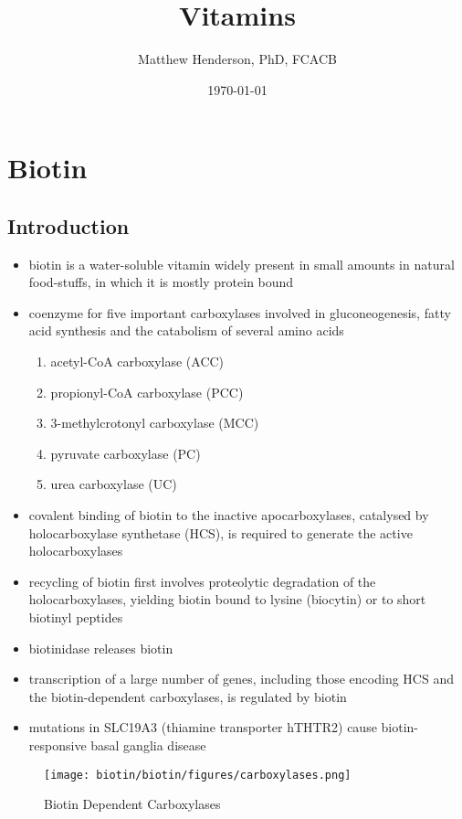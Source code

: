 \documentclass{scrartcl}
\author{Matthew Henderson, PhD, FCACB}
\date{\today}
\title{Vitamins}
\begin{document}
\maketitle
\setcounter{tocdepth}{2}
\tableofcontents


\section{Biotin}
\label{sec:orgbc96604}
\subsection{Introduction}
\label{sec:orgf3c4cba}
\begin{itemize}
\item biotin is a water-soluble vitamin widely present in small amounts in
natural food-stuffs, in which it is mostly protein bound
\item coenzyme for five important carboxylases involved in
gluconeogenesis, fatty acid synthesis and the catabolism of several
amino acids
\begin{enumerate}
\item acetyl-CoA carboxylase (ACC)
\item propionyl-CoA carboxylase (PCC)
\item 3-methylcrotonyl carboxylase (MCC)
\item pyruvate carboxylase (PC)
\item urea carboxylase (UC)
\end{enumerate}
\item covalent binding of biotin to the inactive apocarboxylases,
catalysed by holocarboxylase synthetase (HCS), is required to
generate the active holocarboxylases
\item recycling of biotin first involves proteolytic degradation of the
holocarboxylases, yielding biotin bound to lysine (biocytin) or to
short biotinyl peptides
\item biotinidase releases biotin
\item transcription of a large number of genes, including those encoding
HCS and the biotin-dependent carboxylases, is regulated by biotin
\item mutations in SLC19A3 (thiamine transporter hTHTR2) cause
biotin-responsive basal ganglia disease
\end{itemize}

\begin{figure}[htbp]
\centering
\texttt{[image: biotin/biotin/figures/carboxylases.png]}
\caption{\label{fig:orgf77e711}Biotin Dependent Carboxylases}
\end{figure}
\end{document}
